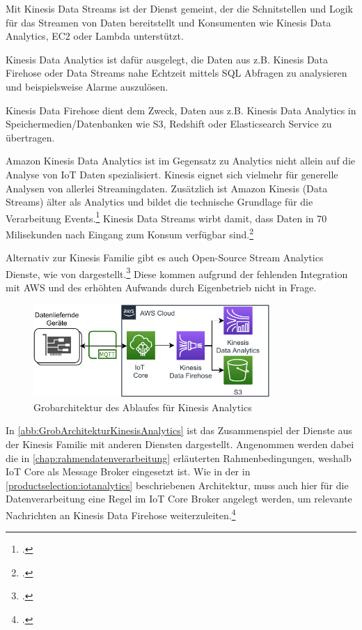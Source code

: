 Mit Kinesis Data Streams ist der Dienst gemeint, der die Schnitstellen und Logik für das Streamen von Daten bereitstellt und Konsumenten wie Kinesis Data Analytics, \ac{EC2} oder Lambda unterstützt. 

Kinesis Data Analytics ist dafür ausgelegt, die Daten aus z.B. Kinesis Data Firehose oder Data Streams nahe Echtzeit mittels \ac{SQL} Abfragen zu analysieren und beispielsweise Alarme auszulösen.

Kinesis Data Firehose dient dem Zweck, Daten aus z.B. Kinesis Data Analytics in Speichermedien/Datenbanken wie \ac{S3}, Redshift oder Elasticsearch Service zu übertragen.

Amazon Kinesis Data Analytics ist im Gegensatz zu \AWSIOT{} Analytics nicht allein auf die Analyse von \ac{IoT} Daten spezialisiert. Kinesis eignet sich vielmehr für generelle Analysen von allerlei Streamingdaten. Zusätzlich ist Amazon Kinesis (Data Streams) älter als \AWSIOT{} Analytics und bildet die technische Grundlage für die Verarbeitung \AWSIOT{} Events.\footcite[Vgl.][]{Pogosova.28.05.2020} Kinesis Data Streams wirbt damit, dass Daten in 70 Milisekunden nach Eingang zum Konsum verfügbar sind.\footcite[Vgl.][]{AmazonWebServicesInc..o.J.af}

Alternativ zur Kinesis Familie gibt es auch Open-Source Stream Analytics Dienste, wie von \citeauthor{Singh.2016} dargestellt.\footcite[Vgl.][]{Singh.2016} Diese kommen aufgrund der fehlenden Integration mit \ac{AWS} und des erhöhten Aufwands durch Eigenbetrieb nicht in Frage.

\begin{figure}[H]
\centering
\includegraphics[width=0.8\textwidth]{graphics/Kinesis-Analytics-general.pdf}
\caption{Grobarchitektur des Ablaufes für Kinesis Analytics}
\label{abb:GrobArchitekturKinesisAnalytics}
\end{figure}
In \autoref{abb:GrobArchitekturKinesisAnalytics} ist das Zusammenspiel der Dienste aus der Kinesis Familie mit anderen Diensten dargestellt. Angenommen werden dabei die in \autoref{chap:rahmendatenverarbeitung} erläuterten Rahmenbedingungen, weshalb \ac{IoT} Core als Message Broker eingesetzt ist. Wie in der in \autoref{productselection:iotanalytics} beschriebenen Architektur, muss auch hier für die Datenverarbeitung eine Regel im \ac{IoT} Core Broker angelegt werden, um relevante Nachrichten an Kinesis Data Firehose weiterzuleiten.\footcite[Vgl.][]{AmazonWebServicesInc..o.J.} 

